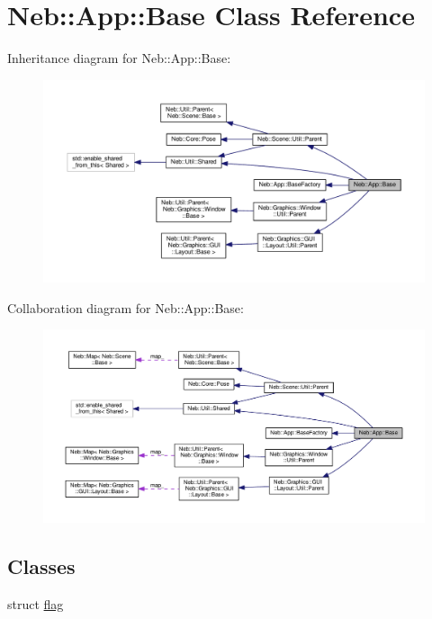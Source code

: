 \hypertarget{classNeb_1_1App_1_1Base}{\section{Neb\-:\-:App\-:\-:Base Class Reference}
\label{classNeb_1_1App_1_1Base}
}


Inheritance diagram for Neb\-:\-:App\-:\-:Base\-:
\nopagebreak
\begin{figure}[H]
\begin{center}
\leavevmode
\includegraphics[width=350pt]{classNeb_1_1App_1_1Base__inherit__graph}
\end{center}
\end{figure}


Collaboration diagram for Neb\-:\-:App\-:\-:Base\-:
\nopagebreak
\begin{figure}[H]
\begin{center}
\leavevmode
\includegraphics[width=350pt]{classNeb_1_1App_1_1Base__coll__graph}
\end{center}
\end{figure}
\subsection*{Classes}
\begin{DoxyCompactItemize}
\item 
struct \hyperlink{structNeb_1_1App_1_1Base_1_1flag}{flag}
\end{DoxyCompactItemize}
